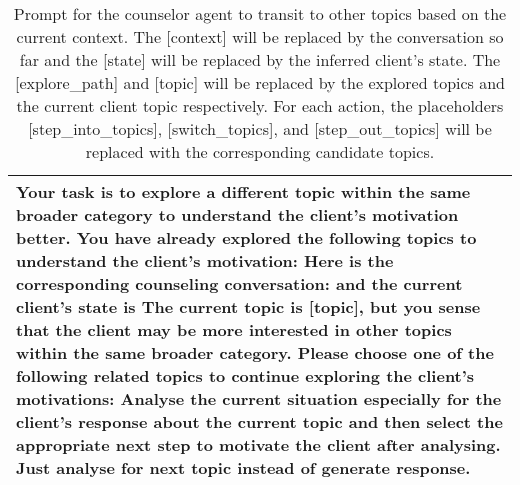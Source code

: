 \begin{table*}[tb]
\begin{tabularx}{\textwidth}{X}
\toprule
{\sf \footnotesize Your task is to explore a different topic within the same broader category to understand the client's motivation better. \newline \newline You have already explored the following topics to understand the client’s motivation:  \newline Here is the corresponding counseling conversation: \newline [context] \newline and the current client's state is \newline [state]\newline \newline The current topic is [topic], but you sense that the client may be more interested in other topics within the same broader category. Please choose one of the following related topics to continue exploring the client’s motivations:  \newline \newline Analyse the current situation especially for the client's response about the current topic and then select the appropriate next step to motivate the client after analysing. Just analyse for next topic instead of generate response.} 
\\ \bottomrule
\end{tabularx}
\caption{Prompt for the counselor agent to transit to other topics based on the current context. The [context] will be replaced by the conversation so far and the [state] will be replaced by the inferred client's state. The [explore\_path] and [topic] will be replaced by the explored topics and the current client topic respectively.  For each action, the placeholders [step\_into\_topics], [switch\_topics], and [step\_out\_topics] will be replaced with the corresponding candidate topics.}
\label{tab:topic switch}
\end{table*}

